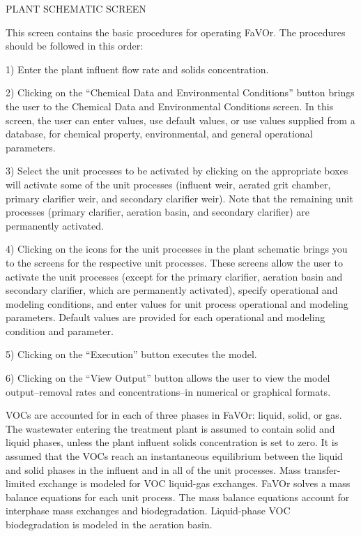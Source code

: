 PLANT SCHEMATIC SCREEN

This screen contains the basic procedures for operating FaVOr. The procedures
should be followed in this order:

1) Enter the plant influent flow rate and solids concentration.

2) Clicking on the ``Chemical Data and Environmental Conditions'' button brings
the user to the Chemical Data and Environmental Conditions screen.  In this
screen, the user can enter values, use default values, or use values supplied
from a database, for chemical property, environmental, and general operational
parameters.

3) Select the unit processes to be activated by clicking on the appropriate
boxes will activate some of the unit processes (influent weir, aerated grit
chamber, primary clarifier weir, and secondary clarifier weir).  Note that the
remaining unit processes (primary clarifier, aeration basin, and secondary
clarifier) are permanently activated.

4) Clicking on the icons for the unit processes in the plant schematic brings
you to the screens for the respective unit processes.  These screens allow the
user to activate the unit processes (except for the primary clarifier, aeration
basin and secondary clarifier, which are permanently activated), specify
operational and modeling conditions, and enter values for unit process
operational and modeling parameters.  Default values are provided for each
operational and modeling condition and parameter.  

5) Clicking on the ``Execution'' button executes the model.

6) Clicking on the ``View Output'' button allows the user to view the model
output--removal rates and concentrations--in numerical or graphical formats.


VOCs are accounted for in each of three phases in FaVOr: liquid, solid, or gas.
The wastewater entering the treatment plant is assumed to contain solid and
liquid phases, unless the plant influent solids concentration is set to zero.
It is assumed that the VOCs reach an instantaneous equilibrium between the
liquid and solid phases in the influent and in all of the unit processes. Mass
transfer-limited exchange is modeled for VOC liquid-gas exchanges.  FaVOr
solves a mass balance equations for each unit process.  The mass balance
equations account for interphase mass exchanges and biodegradation.
Liquid-phase VOC biodegradation is modeled in the aeration basin.  

